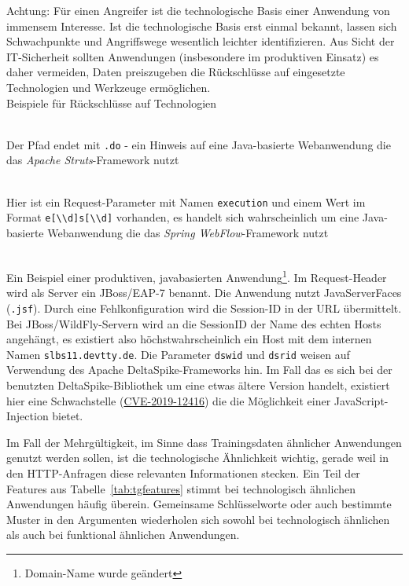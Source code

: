 \textcolor{bhtBlue}{ Achtung:} Für einen Angreifer ist die technologische Basis einer Anwendung von immensem Interesse. Ist die technologische Basis erst einmal bekannt, lassen sich Schwachpunkte und Angriffswege wesentlich leichter identifizieren. Aus Sicht der IT-Sicherheit sollten Anwendungen (insbesondere im produktiven Einsatz) es daher vermeiden, Daten preiszugeben die Rückschlüsse auf eingesetzte Technologien und Werkzeuge ermöglichen.\\

Beispiele für Rückschlüsse auf Technologien
\begin{description}
  \scriptsize
  \item[http://localhost:8080/\underline{test.do}] \hfill \\
Der Pfad endet mit \verb=.do= - ein Hinweis auf eine Java-basierte Webanwendung die das \emph{Apache Struts}-Framework nutzt
  \item[http://localhost:8080/test?\underline{execution=e2s1}] \hfill \\
Hier ist ein Request-Parameter mit Namen \verb=execution= und einem Wert im Format \verb=e[\\d]s[\\d]= vorhanden, es handelt sich wahrscheinlich um eine Java-basierte Webanwendung die das \emph{Spring WebFlow}-Framework nutzt
  \item[https://devtty.de/app/detail\underline{.jsf};jsessionid=jtO85wJZjgNR3jXpeEIzV9npU-\_BQcTyEF-90JTq.\underline{slbs11}?\underline{dswid=3942\&dsrid=213}\&id=1041] \hfill \\
Ein Beispiel einer produktiven, javabasierten Anwendung\footnote{Domain-Name wurde geändert}. Im Request-Header wird als Server ein JBoss/EAP-7 benannt. Die Anwendung nutzt JavaServerFaces (\verb=.jsf=). Durch eine Fehlkonfiguration wird die Session-ID in der URL übermittelt. Bei JBoss/WildFly-Servern wird an die SessionID der Name des echten Hosts angehängt, es existiert also höchstwahrscheinlich ein Host mit dem internen Namen \verb=slbs11.devtty.de=. Die Parameter \verb=dswid= und \verb=dsrid= weisen auf Verwendung des Apache DeltaSpike-Frameworks hin. Im Fall das es sich bei der benutzten DeltaSpike-Bibliothek um eine etwas ältere Version handelt, existiert hier eine Schwachstelle (\href{https://cve.mitre.org/cgi-bin/cvename.cgi?name=CVE-2019-12416}{CVE-2019-12416}) die die Möglichkeit einer JavaScript-Injection bietet. 
\end{description}

Im Fall der Mehrgültigkeit, im Sinne dass Trainingsdaten ähnlicher Anwendungen genutzt werden sollen, ist die technologische Ähnlichkeit wichtig, gerade weil in den HTTP-Anfragen diese relevanten Informationen stecken. Ein Teil der Features aus Tabelle~\ref{tab:tgfeatures} stimmt bei technologisch ähnlichen Anwendungen häufig überein. Gemeinsame Schlüsselworte oder auch bestimmte Muster in den Argumenten wiederholen sich sowohl bei technologisch ähnlichen als auch bei funktional ähnlichen Anwendungen. \\

